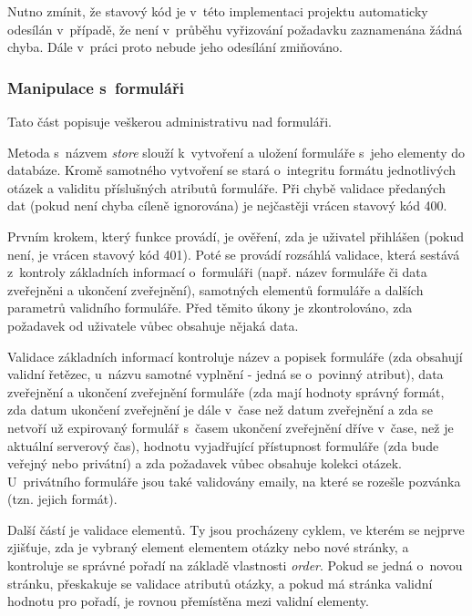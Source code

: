 	Nutno zmínit, že stavový kód  je v~této implementaci projektu automaticky odesílán v~případě, že není v~průběhu vyřizování požadavku zaznamenána žádná chyba. Dále v~práci proto nebude jeho odesílání zmiňováno.
	
		\subsubsection{Manipulace s~formuláři}
		Tato část popisuje veškerou administrativu nad formuláři.
		
			\label{sec:form_store}
			Metoda s~názvem \textit{store} slouží k~vytvoření a uložení formuláře s~jeho elementy do databáze. Kromě samotného vytvoření se stará o~integritu formátu jednotlivých otázek a validitu příslušných atributů formuláře. Při chybě validace předaných dat (pokud není chyba cíleně ignorována) je nejčastěji vrácen stavový kód 400.
			
			Prvním krokem, který funkce provádí, je ověření, zda je uživatel přihlášen (pokud není, je vrácen stavový kód 401). Poté se provádí rozsáhlá validace, která sestává z~kontroly základních informací o~formuláři (např. název formuláře či data zveřejněni a ukončení zveřejnění), samotných elementů formuláře a dalších parametrů validního formuláře. Před těmito úkony je zkontrolováno, zda požadavek od uživatele vůbec obsahuje nějaká data.
			
			Validace základních informací kontroluje název a popisek formuláře (zda obsahují validní řetězec, u~názvu samotné vyplnění - jedná se o~povinný atribut), data zveřejnění a ukončení zveřejnění formuláře (zda mají hodnoty správný formát, zda datum ukončení zveřejnění je dále v~čase než datum zveřejnění a zda se netvoří už expirovaný formulář s~časem ukončení zveřejnění dříve v~čase, než je aktuální serverový čas), hodnotu vyjadřující přístupnost formuláře (zda bude veřejný nebo privátní) a zda požadavek vůbec obsahuje kolekci otázek. U~privátního formuláře jsou také validovány emaily, na které se rozešle pozvánka (tzn. jejich formát).
			
			Další částí je validace elementů. Ty jsou procházeny cyklem, ve kterém se nejprve zjišťuje, zda je vybraný element elementem otázky nebo nové stránky, a kontroluje se správné pořadí na základě vlastnosti \textit{order}. Pokud se jedná o~novou stránku, přeskakuje se validace atributů otázky, a pokud má stránka validní hodnotu pro pořadí, je rovnou přemístěna mezi validní elementy. 
			

